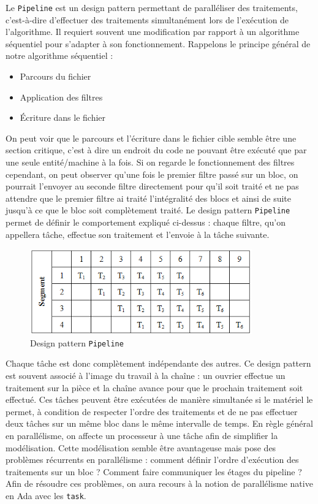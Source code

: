 \documentclass[a4paper]{article}
\begin{document}
Le \texttt{Pipeline} est un design pattern permettant de paralléliser des traitements, c'est-à-dire d'effectuer des traitements simultanément lors de l'exécution de l'algorithme. Il requiert souvent une modification par rapport à un algorithme séquentiel pour s'adapter à son fonctionnement.
\smallbreak
Rappelons le principe général de notre algorithme séquentiel :
\begin{itemize}
\item Parcours du fichier
\item Application des filtres
\item Écriture dans le fichier
\end{itemize}
On peut voir que le parcours et l'écriture dans le fichier cible semble être une section critique, c'est à dire un endroit du code ne pouvant être exécuté que par une seule entité/machine à la fois. Si on regarde le fonctionnement des filtres cependant, on peut observer qu'une fois le premier filtre passé sur un bloc, on pourrait l'envoyer au seconde filtre directement pour qu'il soit traité et ne pas attendre que le premier filtre ai traité l'intégralité des blocs et ainsi de suite jusqu'à ce que le bloc soit complètement traité.
\smallbreak
Le design pattern \texttt{Pipeline} permet de définir le comportement expliqué ci-dessus : chaque filtre, qu'on appellera tâche, effectue son traitement et l'envoie à la tâche suivante.
\begin{figure}[h]
\begin{center}
\includegraphics[scale=1]{images/pipeline.png} 
\caption{Design pattern \texttt{Pipeline}}
\end{center}
\end{figure}
Chaque tâche est donc complètement indépendante des autres. Ce design pattern est souvent associé à l'image du travail à la chaîne : un ouvrier effectue un traitement sur la pièce et la chaîne avance pour que le prochain traitement soit effectué. Ces tâches peuvent être exécutées de manière simultanée si le matériel le permet, à condition de respecter l'ordre des traitements et de ne pas effectuer deux tâches sur un même bloc dans le même intervalle de temps. En règle général en parallélisme, on affecte un processeur à une tâche afin de simplifier la modélisation.
\smallbreak
Cette modélisation semble être avantageuse mais pose des problèmes récurrents en parallélisme : comment définir l'ordre d'exécution des traitements sur un bloc ? Comment faire communiquer les étages du pipeline ?
\smallbreak
Afin de résoudre ces problèmes, on aura recours à la notion de parallélisme native en Ada avec les \texttt{task}.
\end{document}
